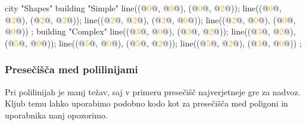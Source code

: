 \documentclass{article}
\newcommand\Num[1]{\textcolor{orange}{#1}}
\begin{document}
\begin{multicols}{2}
\begin{CITY}
  city "Shapes" {
    building "Simple" {
      line((@\Num{0}@, @\Num{0}@), (@\Num{0}@, @\Num{2}@));
      line((@\Num{0}@, @\Num{2}@), (@\Num{2}@, @\Num{2}@));
      line((@\Num{2}@, @\Num{2}@), (@\Num{2}@, @\Num{0}@));
      line((@\Num{2}@, @\Num{0}@), (@\Num{0}@, @\Num{0}@))
    };
    building "Complex" {
      line((@\Num{3}@, @\Num{0}@), (@\Num{3}@, @\Num{2}@));
      line((@\Num{3}@, @\Num{2}@), (@\Num{5}@, @\Num{0}@));
      line((@\Num{5}@, @\Num{0}@), (@\Num{5}@, @\Num{2}@));
      line((@\Num{5}@, @\Num{2}@), (@\Num{3}@, @\Num{0}@))
    };
  }
\end{CITY}

\columnbreak

\end{multicols}

\subsubsection{Presečišča med polilinijami}
Pri polilinijah je manj težav, saj v primeru presečišč najverjetneje gre za nadvoz.
Kljub temu lahko uporabimo podobno kodo kot za presečišča med poligoni in uporabnika nanj opozorimo.
\end{document}
